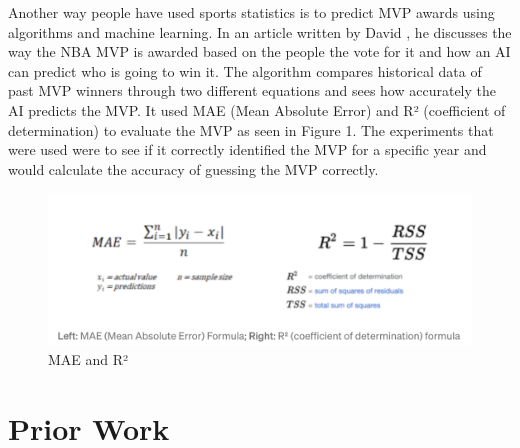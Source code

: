 \documentclass[10pt,twocolumn]{article}
\begin{document}
Another way people have used sports statistics is to predict MVP awards using algorithms and machine learning. In an article written by David \textcite{MVPpredict}, he discusses the way the NBA MVP is awarded based on the people the vote for it and how an AI can predict who is going to win it. The algorithm compares historical data of past MVP winners through two different equations and sees how accurately the AI predicts the MVP. It used MAE (Mean Absolute Error) and R² (coefficient of determination) to evaluate the MVP as seen in Figure 1. The experiments that were used were to see if it correctly identified the MVP for a specific year and would calculate the accuracy of guessing the MVP correctly. 

\begin{figure}
    \centering
    \includegraphics[width=.95\linewidth]{stats.png}
    \caption{
        MAE and R²
    }
    \label{fig:second-page-1}
\end{figure}


\section{Prior Work}
\end{document}
